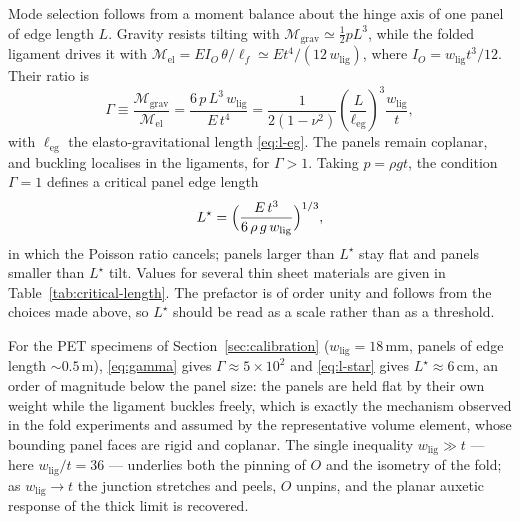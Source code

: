 \documentclass[pdflatex,sn-mathphys-num]{sn-jnl}%
\theoremstyle{thmstyleone}%
\theoremstyle{thmstyletwo}%
\theoremstyle{thmstylethree}%
\newcommand{\wlig}{w_{\mathrm{lig}}}
\begin{document}
Mode selection follows from a moment balance about the hinge axis of one panel of
edge length $L$. Gravity resists tilting with
$\mathcal{M}_{\mathrm{grav}}\simeq\tfrac12 p L^{3}$, while the folded ligament
drives it with $\mathcal{M}_{\mathrm{el}}=E I_{O}\,\theta/\ell_f\simeq
Et^{4}/(12\,\wlig)$, where $I_{O}=\wlig t^{3}/12$. Their ratio is
\begin{equation}
\Gamma\equiv\frac{\mathcal{M}_{\mathrm{grav}}}{\mathcal{M}_{\mathrm{el}}}
=\frac{6\,p\,L^{3}\,\wlig}{E\,t^{4}}
=\frac{1}{2(1-\nu^{2})}\left(\frac{L}{\ell_{\mathrm{eg}}}\right)^{3}\frac{\wlig}{t},
\label{eq:gamma}
\end{equation}
with $\ell_{\mathrm{eg}}$ the elasto-gravitational length \eqref{eq:l-eg}. The
panels remain coplanar, and buckling localises in the ligaments, for $\Gamma>1$.
Taking $p=\rho g t$, the condition $\Gamma=1$ defines a critical panel edge length
\begin{equation}
  L^{\star}=\Bigl(\frac{E\,t^{3}}{6\,\rho\,g\,\wlig}\Bigr)^{1/3},
  \label{eq:l-star}
\end{equation}
in which the Poisson ratio cancels; panels larger than $L^{\star}$ stay flat and
panels smaller than $L^{\star}$ tilt. Values for several thin sheet materials are
given in Table~\ref{tab:critical-length}. The prefactor is of order unity and
follows from the choices made above, so $L^{\star}$ should be read as a scale
rather than as a threshold.

For the PET specimens of Section~\ref{sec:calibration}
($\wlig=18\,\mathrm{mm}$, panels of edge length $\sim0.5\,\mathrm{m}$),
\eqref{eq:gamma} gives $\Gamma\approx5\times10^{2}$ and
\eqref{eq:l-star} gives $L^{\star}\approx6\,\mathrm{cm}$, an order of magnitude
below the panel size: the panels are held flat by their own weight while the
ligament buckles freely, which is exactly the mechanism observed in the fold
experiments and assumed by the representative volume element, whose bounding
panel faces are rigid and coplanar. The single inequality $\wlig\gg t$ --- here
$\wlig/t=36$ --- underlies both the pinning of $O$ and the isometry of the fold;
as $\wlig\to t$ the junction stretches and peels, $O$ unpins, and the planar
auxetic response of the thick limit is recovered.
\end{document}
